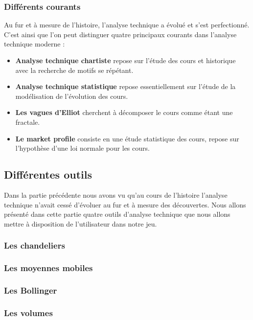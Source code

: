 \subsubsection{Différents courants}

Au fur et à mesure de l'histoire, l'analyse technique a évolué et s'est perfectionné. C'est ainsi que l'on peut distinguer quatre principaux courants dans l'analyse technique moderne :
\begin{itemize}
\item \textbf{Analyse technique chartiste} repose sur l'étude des cours et historique avec la recherche de motifs se répétant.  
\item \textbf{Analyse technique statistique} repose essentiellement sur l'étude de la modélisation de l'évolution des cours.
\item \textbf{Les vagues d'Elliot} cherchent à décomposer le cours comme étant une fractale.
\item \textbf{Le market profile} consiste en une étude statistique des cours, repose sur l'hypothèse d'une loi normale pour les cours. 
\end{itemize}

\subsection{Différentes outils}
Dans la partie précédente nous avons vu qu'au cours de l'histoire l'analyse technique n'avait cessé d'évoluer au fur et à mesure des découvertes. Nous allons présenté dans cette partie quatre outils d'analyse technique que nous allons mettre à disposition de l'utilisateur dans notre jeu. \\

\subsubsection{Les chandeliers}

\subsubsection{Les moyennes mobiles}

\subsubsection{Les Bollinger}

\subsubsection{Les volumes}


